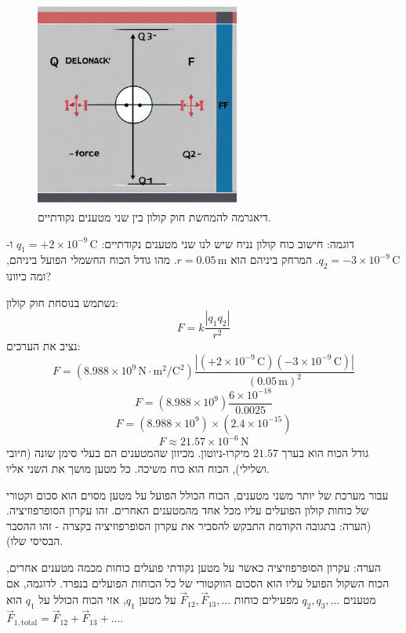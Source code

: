 \documentclass[12pt]{article}
\begin{document}
\begin{figure}[H]
  \centering
  \includegraphics[width=0.6\textwidth]{files/coulomb_law_diagram.png}
  \caption{דיאגרמה להמחשת חוק קולון בין שני מטענים נקודתיים.}
\end{figure}

\begin{exampleBox}{דוגמה: חישוב כוח קולון}
נניח שיש לנו שני מטענים נקודתיים: \(q_1 = +2 \times 10^{-9} \, \text{C}\) ו-\(q_2 = -3 \times 10^{-9} \, \text{C}\). המרחק ביניהם הוא \(r = 0.05 \, \text{m}\). מהו גודל הכוח החשמלי הפועל ביניהם, ומה כיוונו?

נשתמש בנוסחת חוק קולון:
\[F = k \frac{|q_1 q_2|}{r^2}\]
נציב את הערכים:
\[F = (8.988 \times 10^9 \, \text{N} \cdot \text{m}^2/\text{C}^2) \frac{|(+2 \times 10^{-9} \, \text{C})(-3 \times 10^{-9} \, \text{C})|}{(0.05 \, \text{m})^2}\]
\[F = (8.988 \times 10^9) \frac{6 \times 10^{-18}}{0.0025}\]
\[F = (8.988 \times 10^9) \times (2.4 \times 10^{-15})\]
\[F \approx 21.57 \times 10^{-6} \, \text{N}\]
גודל הכוח הוא בערך \(21.57\) מיקרו-ניוטון.
מכיוון שהמטענים הם בעלי סימן שונה (חיובי ושלילי), הכוח הוא כוח משיכה. כל מטען מושך את השני אליו.
\end{exampleBox}

עבור מערכת של יותר משני מטענים, הכוח הכולל הפועל על מטען מסוים הוא סכום וקטורי של כוחות קולון הפועלים עליו מכל אחד מהמטענים האחרים. זהו עקרון הסופרפוזיציה.
(הערה: בתגובה הקודמת התבקש להסביר את עקרון הסופרפוזיציה בקצרה - זהו ההסבר הבסיסי שלו).
\begin{remarkBox}{הערה: עקרון הסופרפוזיציה}
כאשר על מטען נקודתי פועלים כוחות מכמה מטענים אחרים, הכוח השקול הפועל עליו הוא הסכום הווקטורי של כל הכוחות הפועלים בנפרד. לדוגמה, אם מטענים \(q_2, q_3, \dots\) מפעילים כוחות \( \vec{F}_{12}, \vec{F}_{13}, \dots \) על מטען \(q_1\), אזי הכוח הכולל על \(q_1\) הוא \( \vec{F}_{1, \text{total}} = \vec{F}_{12} + \vec{F}_{13} + \dots \).
\end{remarkBox}
\end{document}
